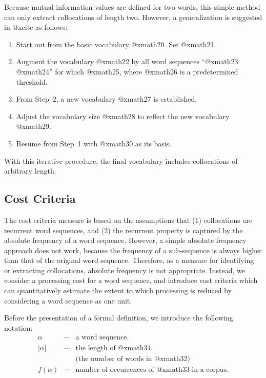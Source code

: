 Because mutual information values are defined for two words,
this simple method can only extract collocations of length two.
However, a generalization is suggested in @xcite as follows:
\begin{enumerate}
\item   Start out from the basic vocabulary @xmath20. Set @xmath21.
\item   Augment the vocabulary @xmath22 by all word sequences ``@xmath23 @xmath24''
        for which @xmath25, where @xmath26 is a predetermined threshold.
\item   From Step~2, a new vocabulary @xmath27 is established.
\item   Adjust the vocabulary size @xmath28 to reflect the new vocabulary @xmath29.
\item   Resume from Step~1 with @xmath30 as its basis.
\end{enumerate}
With this iterative procedure, the final vocabulary includes
collocations of arbitrary length.

\subsection{Cost Criteria}

The cost criteria measure is based on the assumptions that
(1) collocations are recurrent word sequences,
and (2) the recurrent property is captured by
the absolute frequency of a word sequence.
However, a simple absolute frequency approach does not work,
because the frequency of a sub-sequence is always higher
than that of the original word sequence.
Therefore, as a measure for identifying or extracting collocations,
absolute frequency is not appropriate.
Instead, we consider a processing cost for a word sequence,
and introduce cost criteria 
which can quantitatively estimate
the extent to which processing is reduced
by considering a word sequence as one unit.

Before the presentation of a formal definition,
we introduce the following notation:
\begin{eqnarray}
        \alpha    & \cdots & \mbox{a word sequence.}\\
        |\alpha|  & \cdots & \mbox{the length of @xmath31.}\\
                  &        & \mbox{(the number of words in @xmath32)} \nonumber \\
        f(\alpha) & \cdots & \mbox{number of occurrences of @xmath33 in a corpus.}
\end{eqnarray}

